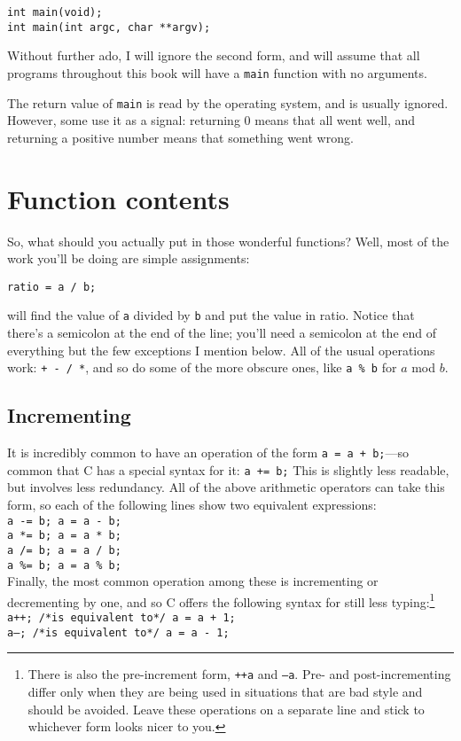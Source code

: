 \documentclass[12pt]{article}
\begin{document}
\begin{verbatim}
int main(void);
int main(int argc, char **argv);
\end{verbatim}

Without further ado, I will ignore the second form, and will assume that all programs throughout this
book will have a {\tt main} function with no arguments.

The return value of {\tt main} is read by the operating system, and is usually ignored. However, some
use it as a signal:  returning 0 means that all went well, and returning a positive number means that
something went wrong.



\section{Function contents}

So, what should you actually put in those wonderful functions? Well, most of the work you'll be doing are
simple assignments:    \index{=}
\begin{verbatim}
ratio = a / b; 
\end{verbatim}
will find the value of {\tt a} divided by {\tt b} and put the value in ratio. Notice that there's a
semicolon at the end of the line; you'll need a semicolon at the end of everything but the few
exceptions I mention below. All of the usual operations work: {\tt + - / *}, and so do some of the more
obscure ones, like {\tt a \% b} for $a$ mod $b$.  \index{\%}

\subsection{Incrementing} It is incredibly common to have an operation of the form {\tt a = a + b;}---so
common that C has a special syntax for it: {\tt a += b;} This is slightly less readable, but involves less
redundancy. All of the above arithmetic operators can take this form, so each of the following lines show two
equivalent expressions: \\
{\tt a -= b;  \phantom{Hello.}   a = a - b;\\
a *= b;  \phantom{Hello.}  a = a * b;\\
a /= b;  \phantom{Hello.}  a = a / b;\\
a \%= b;  \phantom{Hello.}  a = a \% b;\\}
Finally, the most common operation among these is incrementing or decrementing by one, and so C offers the
following syntax for still less typing:\footnote{There is also the pre-increment form, {\tt ++a} and
{\tt --a}. Pre- and post-incrementing differ only when they are being used in situations that are bad style and should
be avoided. Leave these operations on a separate line and stick to whichever form looks nicer to you.} \\
{\tt a++; /*is equivalent to*/ a = a + 1;\\
a--; /*is equivalent to*/ a = a - 1;}
\end{document}
